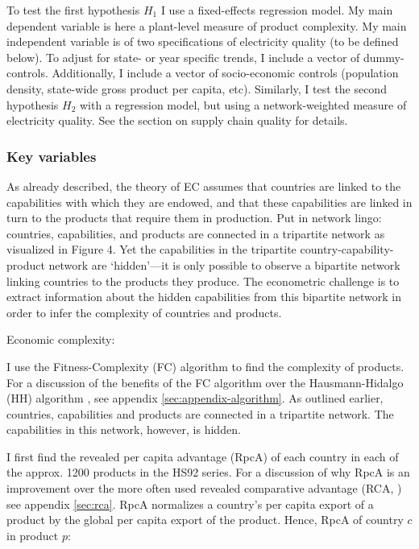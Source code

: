 \documentclass[11pt]{article}
\begin{document}
To test the first hypothesis \(H_1\) I use a fixed-effects regression model. My main dependent variable is here a plant-level measure of product complexity. My main independent variable is of two specifications of electricity quality (to be defined below). To adjust for state- or year specific trends, I include a vector of dummy-controls. Additionally, I include a vector of socio-economic controls (population density, state-wide gross product per capita, etc). Similarly, I test the second hypothesis \(H_2\) with a regression model, but using a network-weighted measure of electricity quality. See the section on supply chain quality for details.

\subsubsection{Key variables}\label{sec:key-variables}
As already described, the theory of EC assumes that countries are linked to the capabilities with which they are endowed, and that these capabilities are linked in turn to the products that require them in production. Put in network lingo: countries, capabilities, and products are connected in a tripartite network as visualized in Figure 4. Yet the capabilities in the tripartite country-capability-product network are ‘hidden’—it is only possible to observe a bipartite network linking countries to the products they produce. The econometric challenge is to extract information about the hidden capabilities from this bipartite network in order to infer the complexity of countries and products.

Economic complexity:

    I use the Fitness-Complexity (FC) algorithm \citep{tacchella_new_2012} to find the complexity of products. For a discussion of the benefits of the FC algorithm over the  Hausmann-Hidalgo (HH) algorithm \citep{hidalgo_building_2009}, see appendix \ref{sec:appendix-algorithm}. As outlined earlier, countries, capabilities and products are connected in a tripartite network. The capabilities in this network, however, is hidden.

I first find the revealed per capita advantage (RpcA) of each country in each of the approx. 1200 products in the HS92 series. For a discussion of why RpcA is an improvement over the more often used revealed comparative advantage (RCA, \citealp{balassa_trade_1965}) see appendix \ref{sec:rca}. RpcA normalizes a country's per capita export of a product by the global per capita export of the product. Hence, RpcA of country \(c\) in product \(p\):
\end{document}
